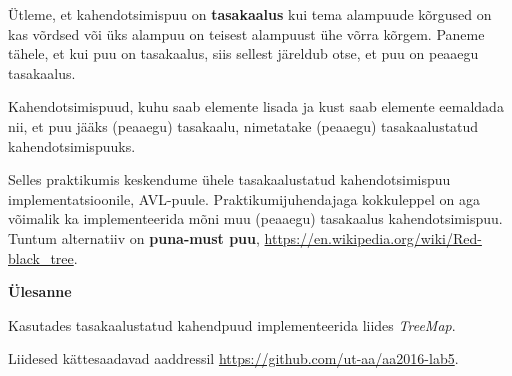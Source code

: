 \documentclass[a4paper]{article}
\begin{document}
Ütleme, et kahendotsimispuu on \textbf{tasakaalus} kui tema alampuude kõrgused on kas võrdsed või üks alampuu on teisest alampuust ühe võrra kõrgem. Paneme tähele, et kui puu on tasakaalus, siis sellest järeldub otse, et puu on peaaegu tasakaalus.

Kahendotsimispuud, kuhu saab elemente lisada ja kust saab elemente eemaldada nii, et puu jääks (peaaegu) tasakaalu, nimetatake (peaaegu) tasakaalustatud kahendotsimispuuks. 

Selles praktikumis keskendume ühele tasakaalustatud kahendotsimispuu implementatsioonile, AVL-puule. Praktikumijuhendajaga kokkuleppel on aga võimalik ka implementeerida mõni muu (peaaegu) tasakaalus kahendotsimispuu. Tuntum alternatiiv on \textbf{puna-must puu}, \url{https://en.wikipedia.org/wiki/Red-black_tree}.



\begin{problem}
\textbf{Ülesanne}

Kasutades tasakaalustatud kahendpuud implementeerida liides \textit{TreeMap}.
\end{problem}

Liidesed kättesaadavad aaddressil \url{https://github.com/ut-aa/aa2016-lab5}.
\end{document}

